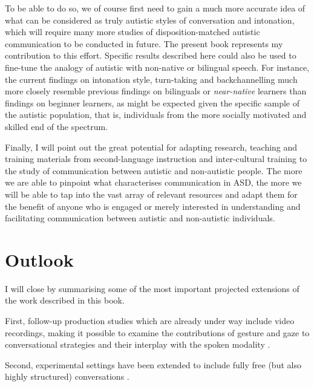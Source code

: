 To be able to do so, we of course first need to gain a much more accurate idea of what can be considered as truly autistic styles of conversation and intonation, which will require many more studies of disposition-matched autistic communication to be conducted in future. The present book represents my contribution to this effort. Specific results described here could also be used to fine-tune the analogy of autistic with non-native or bilingual speech. For instance, the current findings on intonation style, turn-taking and backchannelling much more closely resemble previous findings on bilinguals or \textit{near-native} learners \citep{soraceNearnativeness2003} than findings on beginner learners, as might be expected given the specific sample of the autistic population, that is, individuals from the more socially motivated and skilled end of the spectrum. 

Finally, I will point out the great potential for adapting research, teaching and training materials from second-language instruction and inter-cultural training to the study of communication between autistic and non-autistic people. The more we are able to pinpoint what characterises communication in ASD, the more we will be able to tap into the vast array of relevant resources and adapt them for the benefit of anyone who is engaged or merely interested in understanding and facilitating communication between autistic and non-autistic individuals.












\section{Outlook}\label{sec:Conclusion_conclusion}

I will close by summarising some of the most important projected extensions of the work described in this book.

First, follow-up production studies which are already under way include video recordings, making it possible to examine the contributions of gesture and gaze to conversational strategies and their interplay with the spoken modality \citep[see the pilot study in][]{spaniolMultimodalSignallingInterplay2023}.

Second, experimental settings have been extended to include fully free (but also highly structured) conversations \citep{spaniolMultimodalSignallingInterplay2023}.

